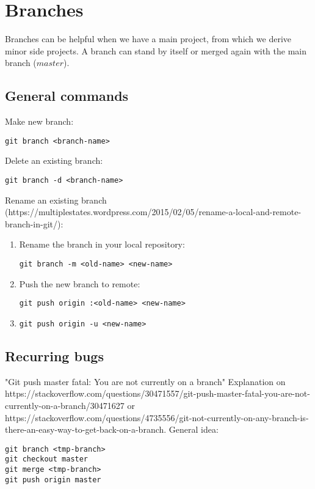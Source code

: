 \documentclass{article}
\begin{document}
\section{Branches}
Branches can be helpful when we have a main project, from which we derive minor side projects. A branch can stand by itself or merged again with the main branch ($master$).

\subsection{General commands}
Make new branch:
\begin{verbatim}
git branch <branch-name>
\end{verbatim}

Delete an existing branch:
\begin{verbatim}
git branch -d <branch-name>
\end{verbatim}

Rename an existing branch (https://multiplestates.wordpress.com/2015/02/05/rename-a-local-and-remote-branch-in-git/):
\begin{enumerate}
    \item Rename the branch in your local repository:
    \begin{verbatim}
git branch -m <old-name> <new-name>
    \end{verbatim}
    \item Push the new branch to remote:
    \begin{verbatim}
git push origin :<old-name> <new-name>
    \end{verbatim}
    \item 
    \begin{verbatim}
git push origin -u <new-name>
    \end{verbatim}
\end{enumerate}

\subsection{Recurring bugs}

"Git push master fatal: You are not currently on a branch"
Explanation on https://stackoverflow.com/questions/30471557/git-push-master-fatal-you-are-not-currently-on-a-branch/30471627 or https://stackoverflow.com/questions/4735556/git-not-currently-on-any-branch-is-there-an-easy-way-to-get-back-on-a-branch.
General idea:
\begin{verbatim}
git branch <tmp-branch>
git checkout master
git merge <tmp-branch>
git push origin master
\end{verbatim}
\end{document}

